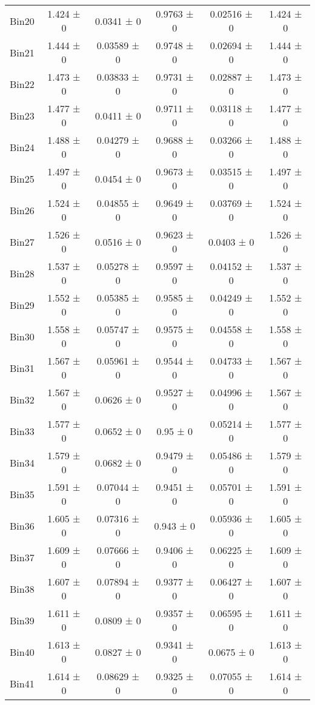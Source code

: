 \begin{tabular}{@{\extracolsep{4pt}}lccccc@{}}
     Bin20 & 1.424 ± 0 & 0.0341 ± 0 & 0.9763 ± 0 & 0.02516 ± 0 & 1.424 ± 0 \\ 
     Bin21 & 1.444 ± 0 & 0.03589 ± 0 & 0.9748 ± 0 & 0.02694 ± 0 & 1.444 ± 0 \\ 
     Bin22 & 1.473 ± 0 & 0.03833 ± 0 & 0.9731 ± 0 & 0.02887 ± 0 & 1.473 ± 0 \\ 
     Bin23 & 1.477 ± 0 & 0.0411 ± 0 & 0.9711 ± 0 & 0.03118 ± 0 & 1.477 ± 0 \\ 
     Bin24 & 1.488 ± 0 & 0.04279 ± 0 & 0.9688 ± 0 & 0.03266 ± 0 & 1.488 ± 0 \\ 
     Bin25 & 1.497 ± 0 & 0.0454 ± 0 & 0.9673 ± 0 & 0.03515 ± 0 & 1.497 ± 0 \\ 
     Bin26 & 1.524 ± 0 & 0.04855 ± 0 & 0.9649 ± 0 & 0.03769 ± 0 & 1.524 ± 0 \\ 
     Bin27 & 1.526 ± 0 & 0.0516 ± 0 & 0.9623 ± 0 & 0.0403 ± 0 & 1.526 ± 0 \\ 
     Bin28 & 1.537 ± 0 & 0.05278 ± 0 & 0.9597 ± 0 & 0.04152 ± 0 & 1.537 ± 0 \\ 
     Bin29 & 1.552 ± 0 & 0.05385 ± 0 & 0.9585 ± 0 & 0.04249 ± 0 & 1.552 ± 0 \\ 
     Bin30 & 1.558 ± 0 & 0.05747 ± 0 & 0.9575 ± 0 & 0.04558 ± 0 & 1.558 ± 0 \\ 
     Bin31 & 1.567 ± 0 & 0.05961 ± 0 & 0.9544 ± 0 & 0.04733 ± 0 & 1.567 ± 0 \\ 
     Bin32 & 1.567 ± 0 & 0.0626 ± 0 & 0.9527 ± 0 & 0.04996 ± 0 & 1.567 ± 0 \\ 
     Bin33 & 1.577 ± 0 & 0.0652 ± 0 & 0.95 ± 0 & 0.05214 ± 0 & 1.577 ± 0 \\ 
     Bin34 & 1.579 ± 0 & 0.0682 ± 0 & 0.9479 ± 0 & 0.05486 ± 0 & 1.579 ± 0 \\ 
     Bin35 & 1.591 ± 0 & 0.07044 ± 0 & 0.9451 ± 0 & 0.05701 ± 0 & 1.591 ± 0 \\ 
     Bin36 & 1.605 ± 0 & 0.07316 ± 0 & 0.943 ± 0 & 0.05936 ± 0 & 1.605 ± 0 \\ 
     Bin37 & 1.609 ± 0 & 0.07666 ± 0 & 0.9406 ± 0 & 0.06225 ± 0 & 1.609 ± 0 \\ 
     Bin38 & 1.607 ± 0 & 0.07894 ± 0 & 0.9377 ± 0 & 0.06427 ± 0 & 1.607 ± 0 \\ 
     Bin39 & 1.611 ± 0 & 0.0809 ± 0 & 0.9357 ± 0 & 0.06595 ± 0 & 1.611 ± 0 \\ 
     Bin40 & 1.613 ± 0 & 0.0827 ± 0 & 0.9341 ± 0 & 0.0675 ± 0 & 1.613 ± 0 \\ 
     Bin41 & 1.614 ± 0 & 0.08629 ± 0 & 0.9325 ± 0 & 0.07055 ± 0 & 1.614 ± 0 \\ 

\end{tabular}
